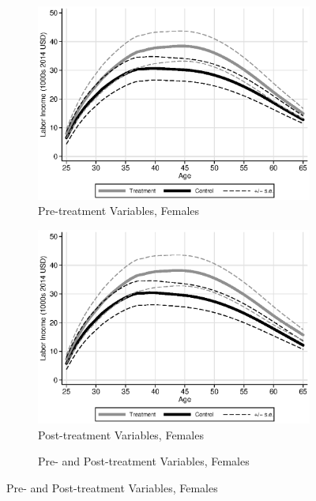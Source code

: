 \begin{figure}
\centering
\caption{Predicted Labor Income Profiles, Varying the Matching Variables}\label{fig:matchvariables}
\begin{subfigure}[h]{0.3\textwidth}
		\centering
		\caption{Pre-treatment Variables, Females}
		\includegraphics[width=\textwidth]{output/labor_25-65_pset1_mset1_female.eps}
\end{subfigure}%
\begin{subfigure}[h]{0.3\textwidth}
	\centering
	\caption{Post-treatment Variables, Females}
		\includegraphics[width=\textwidth]{output/labor_25-65_pset1_mset2_female.eps}
\end{subfigure}%
\begin{subfigure}[h]{0.3\textwidth}
	\centering
	\caption{Pre- and Post-treatment Variables, Females}

\end{subfigure}
\end{figure}

